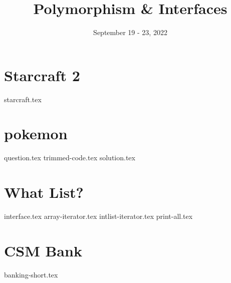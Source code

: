 \documentclass[11pt]{exam}
\title{Polymorphism \& Interfaces}
\date{September 19 - 23, 2022}
\begin{document}
\maketitle


\section{Starcraft 2}
\begin{questions}
{starcraft.tex}
\end{questions}


\pagebreak
\section{pokemon}
\begin{questions}
{question.tex}
{trimmed-code.tex}
{solution.tex}
\end{questions}


\pagebreak
\section{What List?}
\begin{questions}
{interface.tex}
{array-iterator.tex}
\pagebreak
{intlist-iterator.tex}
{print-all.tex}
\end{questions}

\pagebreak

\section{CSM Bank}
\begin{questions}
{banking-short.tex}
\end{questions}

\end{document}
